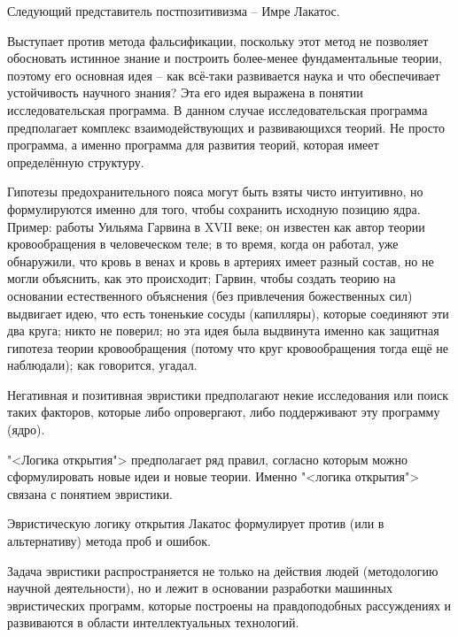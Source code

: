 \documentclass[main.tex]{subfiles}
\begin{document}


Следующий представитель постпозитивизма -- Имре Лакатос.

Выступает против метода фальсификации, поскольку этот метод не позволяет обосновать истинное знание и построить более-менее фундаментальные теории, поэтому его основная идея -- как всё-таки развивается наука и что обеспечивает устойчивость научного знания?
Эта его идея выражена в понятии исследовательская программа.
В данном случае исследовательская программа предполагает комплекс взаимодействующих и развивающихся теорий.
Не просто программа, а именно программа для развития теорий, которая имеет определённую структуру.

Гипотезы предохранительного пояса могут быть взяты чисто интуитивно, но формулируются именно для того, чтобы сохранить исходную позицию ядра.
Пример: работы Уильяма Гарвина в XVII веке; он известен как автор теории кровообращения в человеческом теле; в то время, когда он работал, уже обнаружили, что кровь в венах и кровь в артериях имеет разный состав, но не могли объяснить, как это происходит; Гарвин, чтобы создать теорию на основании естественного объяснения (без привлечения божественных сил) выдвигает идею, что есть тоненькие сосуды (капилляры), которые соединяют эти два круга; никто не поверил; но эта идея была выдвинута именно как защитная гипотеза теории кровообращения (потому что круг кровообращения тогда ещё не наблюдали); как говорится, угадал.

Негативная и позитивная эвристики предполагают некие исследования или поиск таких факторов, которые либо опровергают, либо поддерживают эту программу (ядро).

"<Логика открытия"> предполагает ряд правил, согласно которым можно сформулировать новые идеи и новые теории.
Именно "<логика открытия"> связана с понятием эвристики.



Эвристическую логику открытия Лакатос формулирует против (или в альтернативу) метода проб и ошибок.

Задача эвристики распространяется не только на действия людей (методологию научной деятельности), но и лежит в основании разработки машинных эвристических программ, которые построены на правдоподобных рассуждениях и развиваются в области интеллектуальных технологий.
\end{document}
